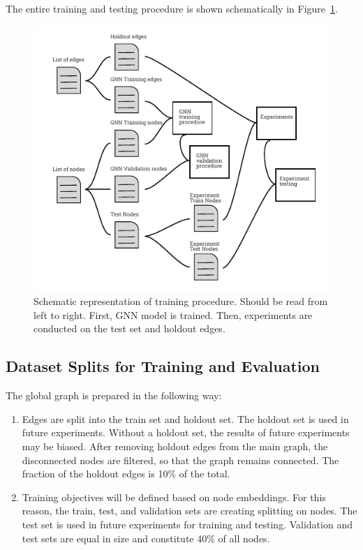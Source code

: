 \documentclass[a4paper,twoside]{article}
\begin{document}
The entire training and testing procedure is shown schematically in Figure~\ref{fig:splits}.

\begin{figure}[]
    \centering
    \includegraphics[width=\columnwidth]{splits.pdf}
    \caption{Schematic representation of training procedure. Should be read from left to right. First, GNN model is trained. Then, experiments are conducted on the test set and holdout edges.}\label{fig:splits}
\end{figure}

\subsection{Dataset Splits for Training and Evaluation}\label{sec:splits}

The global graph is prepared in the following way:
\begin{enumerate}
    \item Edges are split into the train set and holdout set. The holdout set is used in future experiments. Without a holdout set, the results of future experiments may be biased. After removing holdout edges from the main graph, the disconnected nodes are filtered, so that the graph remains connected. The fraction of the holdout edges is 10\% of the total.
    \item Training objectives will be defined based on node embeddings. For this reason, the train, test, and validation sets are creating splitting on nodes. The test set is used in future experiments for training and testing. Validation and test sets are equal in size and constitute 40\% of all nodes.
\end{enumerate}
\end{document}
